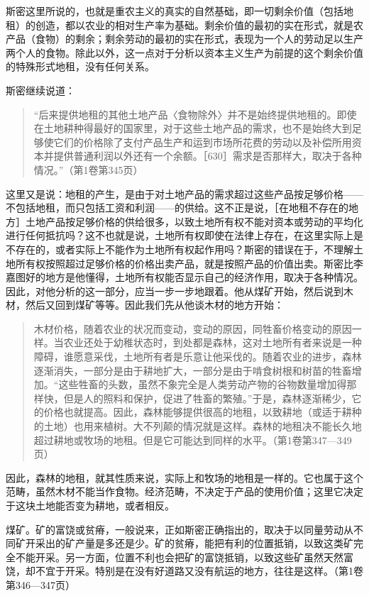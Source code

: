 斯密这里所说的，也就是重农主义的真实的自然基础，即一切剩余价值（包括地租）的创造，都以农业的相对生产率为基础。剩余价值的最初的实在形式，就是农产品（食物）的剩余；剩余劳动的最初的实在形式，表现为一个人的劳动足以生产两个人的食物。除此以外，这一点对于分析以资本主义生产为前提的这个剩余价值的特殊形式地租，没有任何关系。

斯密继续说道：

\begin{quote}{“后来提供地租的其他土地产品〈食物除外〉并不是始终提供地租的。即使在土地耕种得最好的国家里，对于这些土地产品的需求，也不是始终大到足够使它们的价格除了支付产品生产和运到市场所花费的劳动以及补偿所用资本并提供普通利润以外还有一个余额。［630］需求是否那样大，取决于各种情况。”（第1卷第345页）}\end{quote}

这里又是说：地租的产生，是由于对土地产品的需求超过这些产品按足够价格——不包括地租，而只包括工资和利润——的供给。这不正是说，［在地租不存在的地方］土地产品按足够价格的供给很多，以致土地所有权不能对资本或劳动的平均化进行任何抵抗吗？这不也就是说，土地所有权即使在法律上存在，在这里实际上是不存在的，或者实际上不能作为土地所有权起作用吗？斯密的错误在于，不理解土地所有权按照超过足够价格的价格出卖产品，就是按照产品的价值出卖。斯密比李嘉图好的地方是他懂得，土地所有权能否显示自己的经济作用，取决于各种情况。因此，对他分析的这一部分，应当一步一步地跟着。他从煤矿开始，然后说到木材，然后又回到煤矿等等。因此我们先从他谈木材的地方开始：

\begin{quote}{木材价格，随着农业的状况而变动，变动的原因，同牲畜价格变动的原因一样。当农业还处于幼稚状态时，到处都是森林，这对土地所有者来说是一种障碍，谁愿意采伐，土地所有者是乐意让他采伐的。随着农业的进步，森林逐渐消失，一部分是由于耕地扩大，一部分是由于啃食树根和树苗的牲畜增加。“这些牲畜的头数，虽然不象完全是人类劳动产物的谷物数量增加得那样快，但是人的照料和保护，促进了牲畜的繁殖。”于是，森林逐渐稀少，它的价格也就提高。因此，森林能够提供很高的地租，以致耕地（或适于耕种的土地）也用来植树。大不列颠的情况就是这样。森林的地租决不能长久地超过耕地或牧场的地租。但是它可能达到同样的水平。（第1卷第347—349页）}\end{quote}

因此，森林的地租，就其性质来说，实际上和牧场的地租是一样的。它也属于这个范畴，虽然木材不能当作食物。经济范畴，不决定于产品的使用价值；这里它决定于这块土地能否变为耕地，或者相反。

煤矿。矿的富饶或贫瘠，一般说来，正如斯密正确指出的，取决于以同量劳动从不同矿开采出的矿产量是多还是少。矿的贫瘠，能把有利的位置抵销，以致这类矿完全不能开采。另一方面，位置不利也会把矿的富饶抵销，以致这些矿虽然天然富饶，却不宜于开采。特别是在没有好道路又没有航运的地方，往往是这样。（第1卷第346—347页）

